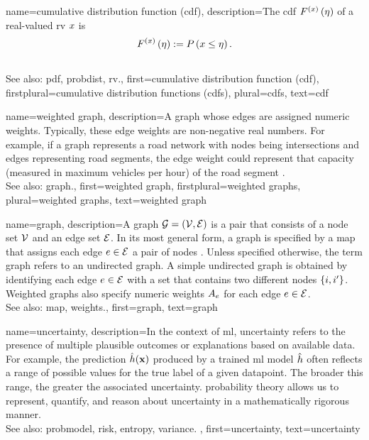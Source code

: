 {name={cumulative distribution function (cdf)},
	description={The  cdf 
	$F^{(x)}\left(\eta\right)$ of a real-valued \gls{rv} $x$ is \cite{AshProbMeasure,papoulis}
	$$F^{(x)}\left(\eta\right) := P\left(x \leq \eta\right).$$
					\\ 
		See also: \gls{pdf}, \gls{probdist}, \gls{rv}.},
	first={cumulative distribution function (cdf)},
	firstplural={cumulative distribution functions (cdfs)}, 
	plural={cdfs}, 
	text={cdf} 
}

{name={weighted graph},
	description={A \gls{graph} whose edges 
	are assigned numeric weights. Typically, these edge weights 
	are non-negative real numbers. For example, if a graph represents 
	a road network with nodes being intersections and edges representing 
	road segments, the edge weight could represent that capacity (measured 
	in maximum vehicles per hour) of the road segment \cite{NewmannBook}.  
					\\ 
		See also: \gls{graph}.},
	first={weighted graph},
	firstplural={weighted graphs}, 
	plural={weighted graphs}, 
	text={weighted graph} 
}



{name={graph},
	description={A graph $\mathcal{G} = \left( \mathcal{V},\mathcal{E} \right)$ 
	is a pair that consists of a node set $\mathcal{V}$ and an edge set $\mathcal{E}$. 
	In its most general form, a graph is specified by a \gls{map} that 
	assigns each edge $e \in \mathcal{E}$ a pair of nodes \cite{RockNetworks}. 
	Unless specified otherwise, the term graph refers to an undirected graph. 
	A simple undirected graph is obtained by identifying each edge $e \in \mathcal{E}$ 
	with a set that contains two different nodes $\{i,i'\}$. 
	Weighted graphs also specify numeric \gls{weights} $A_{e}$ for each 
	edge $e \in \mathcal{E}$.
					\\ 
		See also: \gls{map}, \gls{weights}.},
	first={graph},
	text={graph} 
}

{name={uncertainty},
	description={In the context of \gls{ml}, uncertainty refers to the presence of multiple 
		plausible outcomes or \glspl{explanation} based on available \gls{data}. For example, the 
		\gls{prediction} $\hat{h}({\bf x})$ produced by a trained \gls{ml} \gls{model} $\hat{h}$
	 	often reflects a range of possible values for the true \gls{label} of a given \gls{datapoint}. 
	 	The broader this range, the greater the associated uncertainty. \Gls{probability} theory 
	 	allows us to represent, quantify, and reason about uncertainty in a 
	 	mathematically rigorous manner.
					\\ 
		See also: \gls{probmodel}, \gls{risk}, \gls{entropy}, \gls{variance}. },
	first={uncertainty},
	text={uncertainty}
}

